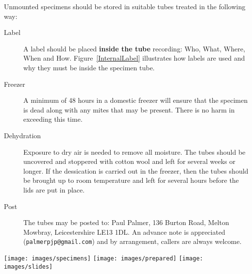 \documentclass[]{article}
\begin{document}
Unmounted specimens should be stored in suitable tubes treated in the following way:
\begin{description}
	\item[Label] A label should be placed \textbf{inside the tube} recording: Who, What, Where, When and How. Figure~\ref{InternalLabel} illustrates how labels are used and why they must be inside the specimen tube.
	\item[Freezer] A minimum of 48 hours in a domestic freezer will ensure that the specimen is dead along with any mites that may be present. There is no harm in exceeding this time.
	\item[Dehydration] Exposure to dry air is needed to remove all moisture. The tubes should be uncovered and stoppered with cotton wool and left for several weeks or longer. If the dessication is carried out in the freezer, then the tubes should be brought up to room temperature and left for several hours before the lids are put in place.
	\item[Post] The tubes may be posted to: Paul Palmer, 136 Burton Road, Melton Mowbray, Leicestershire LE13 1DL. An advance note is appreciated \\ (\texttt{palmerpjp@gmail.com}) and by arrangement, callers are always welcome.
\end{description}


\begin{center}
	\centering
	\texttt{[image: images/specimens]}\hfill
	\texttt{[image: images/prepared]}\hfill
	\texttt{[image: images/slides]}\hfill
	\label{InternalLabel}
\end{center}
\end{document}

